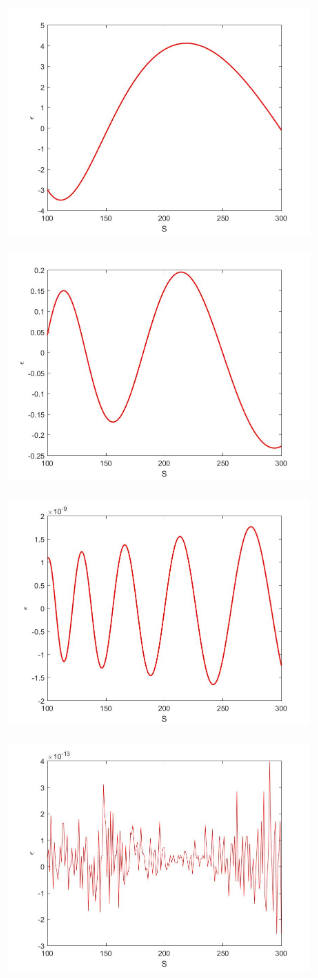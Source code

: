 \documentclass[a4paper,11pt]{article}
\begin{document}
\begin{figure}[!h]
\begin{subfigure}[c]{0.5\textwidth}
\includegraphics[width=8cm]{plot11.jpeg}
\end{subfigure}
\begin{subfigure}[c]{0.5\textwidth}
\includegraphics[width=8cm]{plot12.jpeg}
\end{subfigure}
\begin{subfigure}[c]{0.5\textwidth}
\includegraphics[width=8cm]{plot13.jpeg}
\end{subfigure}
\begin{subfigure}[c]{0.5\textwidth}
\includegraphics[width=8cm]{plot14.jpeg}

\end{subfigure}
\end{figure}
\end{document}
